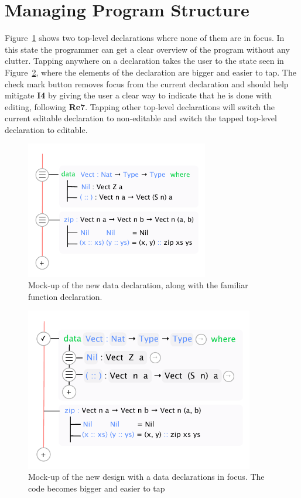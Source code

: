 \section{Managing Program Structure}
\label{subsec:managing_program_structure}
Figure~\ref{fig:new_data_declaration} shows two top-level declarations
where none of them are in focus. 
In this state the programmer can get a clear overview of the program without any clutter. 
Tapping anywhere on a declaration takes the user to the state seen in Figure~\ref{fig:new_design_data_in_focus}, where the elements of the declaration are bigger and easier to tap.
The check mark button removes focus from the current declaration and should help mitigate \textbf{I4} by giving the user a clear way to indicate that he is done with editing, following \textbf{Re7}.
Tapping other top-level declarations will switch the current editable declaration to non-editable and switch the tapped top-level declaration to editable.

\begin{figure}
	\centering
		\includegraphics[width=80mm]{diagrams/final_design_nothing_in_focus.pdf}
	\caption{Mock-up of the new data declaration, along with the familiar function declaration.}
\label{fig:new_data_declaration}
\end{figure}

\begin{figure}
	\centering
		\includegraphics[width=100mm]{diagrams/final_design_top_dec_in_focus.pdf}
	\caption{Mock-up of the new design with a data declarations in focus. The code becomes
	bigger and easier to tap}
\label{fig:new_design_data_in_focus}
\end{figure}


